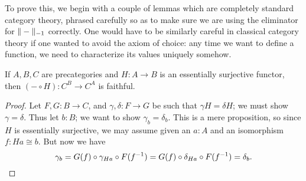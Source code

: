 To prove this, we begin with a couple of lemmas which are completely standard category theory, phrased carefully so as to make sure we are using the eliminator for $\Vert -\Vert_{-1}$ correctly.
One would have to be similarly careful in classical category theory if one wanted to avoid the axiom of choice: any time we want to define a function, we need to characterize its values uniquely somehow.

\begin{lem}
  If $A,B,C$ are precategories and $H:A\to B$ is an essentially surjective functor, then $(-\circ H):C^B \to C^A$ is faithful.
\end{lem}
\begin{proof}
  Let $F,G:B\to C$, and $\gamma,\delta:F\to G$ be such that $\gamma H = \delta H$; we must show $\gamma=\delta$.
  Thus let $b:B$; we want to show $\gamma_b=\delta_b$.
  This is a mere proposition, so since $H$ is essentially surjective, we may assume given an $a:A$ and an isomorphism $f:Ha\cong b$.
  But now we have
  \[ \gamma_b = G(f) \circ \gamma_{Ha} \circ F({f}^{-1}) 
  = G(f) \circ \delta_{Ha} \circ F({f}^{-1})
  = \delta_b.\qedhere
  \]
\end{proof}

